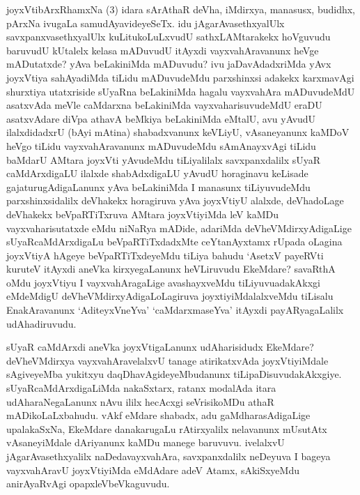 \begin{artha}%
joyxVtibArxRhamxNa (3) idara sArAthaR deVha, iMdirxya, manasusx, budidhx, pArxNa ivugaLa samudAyavideyeSeTx. idu jAgarAvasethxyalUlx savxpanxvasethxyalUlx kuLitukoLuLxvudU sathxLAMtarakekx hoVguvudu baruvudU kUtalelx kelasa mADuvudU itAyxdi vayxvahAravanunx heVge mADutatxde? yAva beLakiniMda mADuvudu? ivu jaDavAdadxriMda yAvx joyxVtiya sahAyadiMda tiLidu mADuvudeMdu parxshinxsi adakekx karxmavAgi shurxtiya utatxriside sUyaRna beLakiniMda hagalu vayxvahAra mADuvudeMdU asatxvAda meVle caMdarxna beLakiniMda vayxvaharisuvudeMdU eraDU asatxvAdare diVpa athavA beMkiya beLakiniMda eMtalU, avu yAvudU ilalxdidadxrU (bAyi mAtina) shabadxvanunx keVLiyU, vAsaneyanunx kaMDoV heVgo tiLidu vayxvahAravanunx mADuvudeMdu sAmAnayxvAgi tiLidu baMdarU AMtara joyxVti yAvudeMdu tiLiyalilalx savxpanxdalilx sUyaR caMdArxdigaLU ilalxde shabAdxdigaLU yAvudU horaginavu keLisade gajaturugAdigaLanunx yAva beLakiniMda I manasunx tiLiyuvudeMdu parxshinxsidalilx deVhakekx horagiruva yAva joyxVtiyU alalxde, deVhadoLage deVhakekx beVpaRTiTxruva AMtara joyxVtiyiMda leV kaMDu vayxvaharisutatxde eMdu niNaRya mADide, adariMda deVheVMdirxyAdigaLige sUyaRcaMdArxdigaLu beVpaRTiTxdadxMte ceYtanAyxtamx rUpada oLagina joyxVtiyA hAgeye beVpaRTiTxdeyeMdu tiLiya bahudu `AsetxV payeRVti kuruteV itAyxdi aneVka kirxyegaLanunx heVLiruvudu EkeMdare? savaRthA oMdu joyxVtiyu I vayxvahAragaLige avashayxveMdu tiLiyuvuadakAkxgi eMdeMdigU deVheVMdirxyAdigaLoLagiruva joyxtiyiMdalalxveMdu tiLisalu EnakAravanunx `AditeyxVneYva' `caMdarxmaseYva' itAyxdi payARyagaLalilx udAhadiruvudu.
\end{artha}

\begin{artha}
sUyaR caMdArxdi aneVka joyxVtigaLanunx udAharisidudx EkeMdare? deVheVMdirxya vayxvahAravelalxvU tanage atirikatxvAda joyxVtiyiMdale sAgiveyeMba yukitxyu daqDhavAgideyeMbudanunx tiLipaDisuvudakAkxgiye. sUyaRcaMdArxdigaLiMda nakaSxtarx, ratanx modalAda itara udAharaNegaLanunx nAvu ililx hecAcxgi seVrisikoMDu athaR mADikoLaLxbahudu. vAkf eMdare shabadx, adu gaMdharasAdigaLige upalakaSxNa, EkeMdare danakarugaLu rAtirxyalilx nelavanunx mUsutAtx vAsaneyiMdale dAriyanunx kaMDu manege baruvuvu. ivelalxvU jAgarAvasethxyalilx naDedavayxvahAra, savxpanxdalilx neDeyuva I bageya vayxvahAravU joyxVtiyiMda eMdAdare adeV Atamx, sAkiSxyeMdu anirAyaRvAgi opapxleVbeVkaguvudu.
\end{artha}

